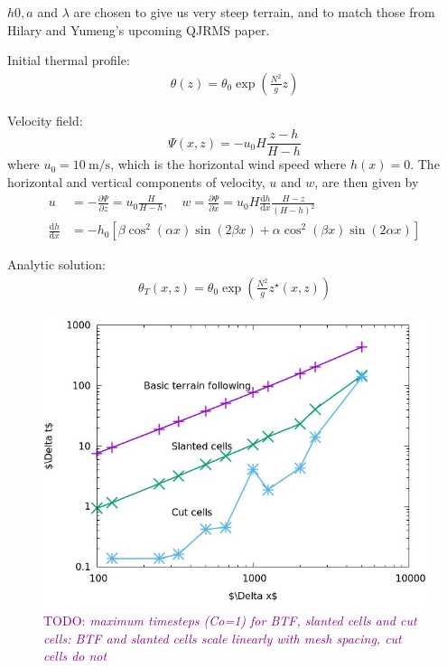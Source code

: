 \documentclass{article}
\newcommand{\TODO}[1]{\textcolor{purple}{TODO: \emph{#1}}}
\begin{document}
$h0, a$ and $\lambda$ are chosen to give us very steep terrain, and to match those from Hilary and Yumeng's upcoming QJRMS paper.

Initial thermal profile:
\begin{align}
	\theta(z) = \theta_0 \exp \left( \frac{N^2}{g} z \right) \label{eqn:thermal-profile}
\end{align}

Velocity field:
\begin{equation}
	\Psi(x,z) = -u_0 H \frac{z - h}{H - h} \label{eqn:streamfunc-btf}
\end{equation}
where $u_0 = \SI{10}{\meter\per\second}$, which is the horizontal wind speed where $h(x) = 0$.
The horizontal and vertical components of velocity, $u$ and $w$, are then given by
\begin{align}
	u &= -\frac{\partial \Psi}{\partial z} = u_0 \frac{H}{H - h}, \quad w = \frac{\partial \Psi}{\partial x} = u_0 H \frac{\mathrm{d} h}{\mathrm{d} x} \frac{H - z}{\left( H - h \right)^2} \label{eqn:uw-btf} \\
	\frac{\mathrm{d} h}{\mathrm{d} x} &= - h_0 \left[ 
		\beta \cos^2 \left( \alpha x \right) \sin \left( 2 \beta x \right) +
		\alpha \cos^2 \left( \beta x \right) \sin \left( 2 \alpha x \right)
	\right]
\end{align}

Analytic solution:
\begin{align}
	\theta_T(x, z) = \theta_0 \exp \left( \frac{N^2}{g} z^\star(x, z) \right) 
\end{align}

\begin{figure}
	\includegraphics[width=\textwidth]{maxTimesteps.png}
	\caption{\TODO{maximum timesteps (Co=1) for BTF, slanted cells and cut cells: BTF and slanted cells scale linearly with mesh spacing, cut cells do not}}
\end{figure}
\end{document}
